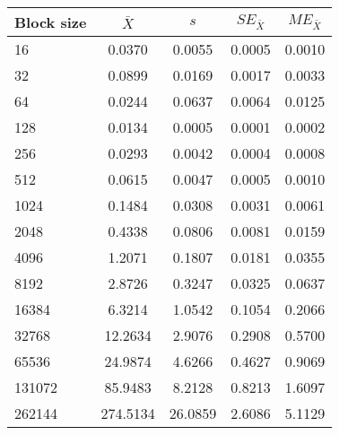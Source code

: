 \begin{tabular}{lcccc}\toprule
{\small Block size} & $\bar{X}$ & $s$ & $SE_{\bar{X}}$ & $ME_{\bar{X}}$ \\\midrule
16 & 0.0370 & 0.0055 & 0.0005 & 0.0010\\
32 & 0.0899 & 0.0169 & 0.0017 & 0.0033\\
64 & 0.0244 & 0.0637 & 0.0064 & 0.0125\\
128 & 0.0134 & 0.0005 & 0.0001 & 0.0002\\
256 & 0.0293 & 0.0042 & 0.0004 & 0.0008\\
512 & 0.0615 & 0.0047 & 0.0005 & 0.0010\\
1024 & 0.1484 & 0.0308 & 0.0031 & 0.0061\\
2048 & 0.4338 & 0.0806 & 0.0081 & 0.0159\\
4096 & 1.2071 & 0.1807 & 0.0181 & 0.0355\\
8192 & 2.8726 & 0.3247 & 0.0325 & 0.0637\\
16384 & 6.3214 & 1.0542 & 0.1054 & 0.2066\\
32768 & 12.2634 & 2.9076 & 0.2908 & 0.5700\\
65536 & 24.9874 & 4.6266 & 0.4627 & 0.9069\\
131072 & 85.9483 & 8.2128 & 0.8213 & 1.6097\\
262144 & 274.5134 & 26.0859 & 2.6086 & 5.1129\\
\bottomrule
\end{tabular}
